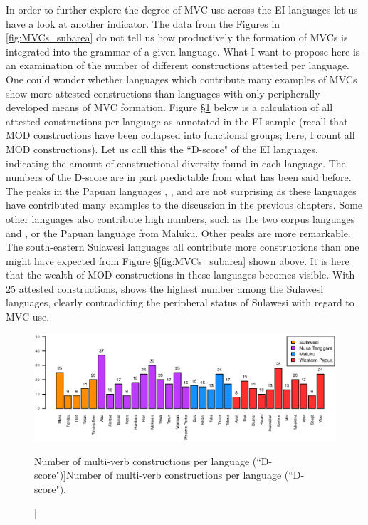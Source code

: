 In order to further explore the degree of MVC use across the EI languages let us have a look at another indicator. The data from the Figures in \ref{fig:MVCs_subarea} do not tell us how productively the formation of MVCs is integrated into the grammar of a given language. What I want to propose here is an examination of the number of different constructions attested per language. One could wonder whether languages which contribute many examples of MVCs show more attested constructions than languages with only peripherally developed means of MVC formation. Figure §\ref{fig:number_types} below is a calculation of all attested constructions per language as annotated in the EI sample (recall that MOD constructions have been collapsed into functional groups; here, I count all MOD constructions). Let us call this the ``D-score" of the EI languages, indicating the amount of constructional diversity found in each language. The numbers of the D-score are in part predictable from what has been said before. The peaks in the Papuan languages , , and  are not surprising as these languages have contributed many examples to the discussion in the previous chapters. Some other languages also contribute high numbers, such as the two corpus languages  and , or the Papuan language  from Maluku. Other peaks are more remarkable. The south-eastern Sulawesi languages all contribute more constructions than one might have expected from Figure §\ref{fig:MVCs_subarea} shown above. It is here that the wealth of MOD constructions in these languages becomes visible. With 25 attested constructions,  shows the highest number among the Sulawesi languages, clearly contradicting the peripheral status of Sulawesi with regard to MVC use.

\begin{figure}
\includegraphics[width=\columnwidth]{figures/MVCs_languages_clean.eps}
\caption[Number of multi-verb constructions per language (``D-score")]{Number of multi-verb constructions per language (``D-score").}\label{fig:number_types}
\end{figure}

